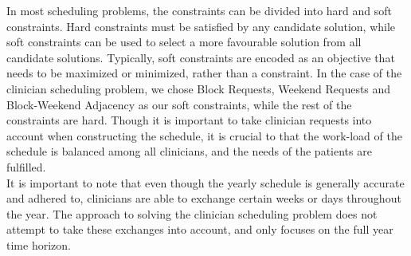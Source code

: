 In most scheduling problems, the constraints can be divided into hard and soft constraints. Hard constraints must be satisfied by any candidate solution, while soft constraints can be used to select a more favourable solution from all candidate solutions. Typically, soft constraints are encoded as an objective that needs to be maximized or minimized, rather than a constraint. In the case of the clinician scheduling problem, we chose Block Requests, Weekend Requests and Block-Weekend Adjacency as our soft constraints, while the rest of the constraints are hard. Though it is important to take clinician requests into account when constructing the schedule, it is crucial to that the work-load of the schedule is balanced among all clinicians, and the needs of the patients are fulfilled. \\

It is important to note that even though the yearly schedule is generally accurate and adhered to, clinicians are able to exchange certain weeks or days throughout the year. The approach to solving the clinician scheduling problem does not attempt to take these exchanges into account, and only focuses on the full year time horizon.